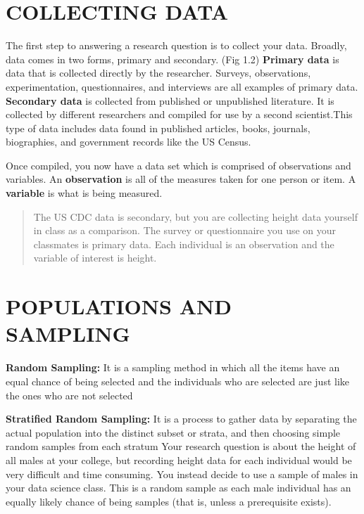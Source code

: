 \documentclass[
]{book}
\begin{document}
\hypertarget{collecting-data}{%
\section{COLLECTING DATA}\label{collecting-data}}

The first step to answering a research question is to collect
your data. Broadly, data comes in two forms, primary and
secondary. (Fig 1.2) \textbf{Primary data} is data that is collected
directly by the researcher. Surveys, observations,
experimentation, questionnaires, and interviews are all examples
of primary data. \textbf{Secondary data} is collected from published
or unpublished literature. It is collected by different
researchers and compiled for use by a second scientist.This type
of data includes data found in published articles, books,
journals, biographies, and government records like the US Census.

Once compiled, you now have a data set which is comprised of
observations and variables. An \textbf{observation} is all of the
measures taken for one person or item. A \textbf{variable} is what is
being measured.

\begin{quote}
The US CDC data is secondary, but you are collecting height
data yourself in class as a comparison. The survey or
questionnaire you use on your classmates is primary data. Each
individual is an observation and the variable of interest is
height.
\end{quote}

\hypertarget{populations-and-sampling}{%
\section{POPULATIONS AND SAMPLING}\label{populations-and-sampling}}

\textbf{Random Sampling:} It is a sampling method in which all the
items have an equal chance of being selected and the individuals
who are selected are just like the ones who are not selected

\textbf{Stratified Random Sampling:} It is a process to gather data by
separating the actual population into the distinct subset or
strata, and then choosing simple random samples from each stratum
Your research question is about the height of all males at your
college, but recording height data for each individual would be
very difficult and time consuming. You instead decide to use a
sample of males in your data science class. This is a random
sample as each male individual has an equally likely chance of
being samples (that is, unless a prerequisite exists).
\end{document}
